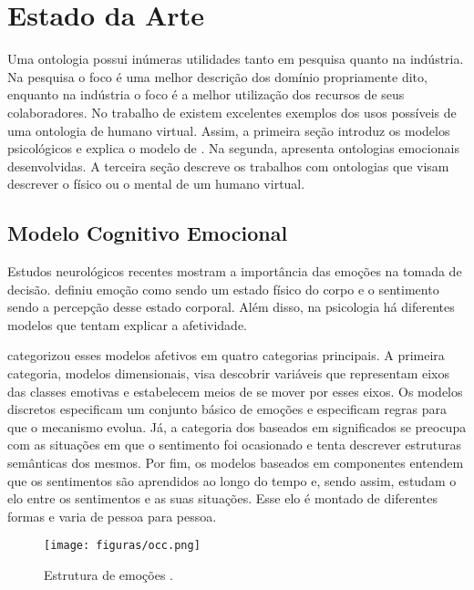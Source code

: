 \chapter{Estado da Arte} \label{cap:eda}

Uma ontologia possui inúmeras utilidades tanto em pesquisa quanto na
indústria. Na pesquisa o foco é uma melhor descrição dos domínio propriamente
dito, enquanto na indústria o foco é a melhor utilização dos recursos de seus
colaboradores. No trabalho de \citet{Gutierrez:2007:OVH:1229160.1229164} existem
excelentes exemplos dos usos possíveis de uma ontologia de humano virtual.
Assim, a primeira seção introduz os modelos psicológicos e explica o modelo de
\citet{ortony1988cse}. Na segunda, apresenta ontologias emocionais
desenvolvidas. A terceira seção descreve os trabalhos com ontologias que visam
descrever o físico ou o mental de um humano virtual.

\section{Modelo Cognitivo Emocional} \label{cap:eda:mce}

Estudos neurológicos recentes \cite{ledoux1998emotional,damasio2004erro}
mostram a importância das emoções na tomada de decisão.
\citet{damasio2004erro} definiu emoção como sendo um estado físico do corpo e
o sentimento sendo a percepção desse estado corporal. Além disso, na psicologia
há diferentes modelos que tentam explicar a afetividade.

\citet{scherer2000tnoe} categorizou esses modelos afetivos em quatro
categorias principais. A primeira categoria, modelos dimensionais, visa
descobrir variáveis que representam eixos das classes emotivas e estabelecem
meios de se mover por esses eixos. Os modelos discretos especificam um
conjunto básico de emoções e especificam regras para que o mecanismo evolua.
Já, a categoria dos baseados em significados se preocupa com as situações
em que o sentimento foi ocasionado e tenta descrever estruturas semânticas dos
mesmos. Por fim, os modelos baseados em componentes entendem que os
sentimentos são aprendidos ao longo do tempo e, sendo assim, estudam o elo
entre os sentimentos e as suas situações. Esse elo é montado de diferentes
formas e varia de pessoa para pessoa.

\begin{figure}[t]
  \centering
    \texttt{[image: figuras/occ.png]}
  \caption{Estrutura de emoções \cite{ortony1988cse}.}
  \label{fig:occ_model}
\end{figure}

